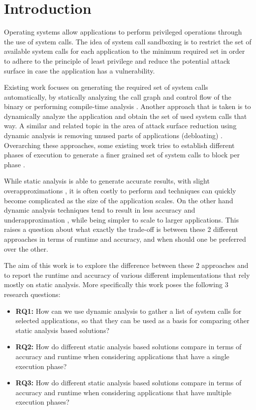 \section{Introduction}
Operating systems allow applications to perform privileged operations through the use of system calls. The idea of system call sandboxing is to restrict the set of available system calls for each application to the minimum required set in order to adhere to the principle of least privilege \cite{ref_plp_1} and reduce the potential attack surface in case the application has a vulnerability.

Existing work focuses on generating the required set of system calls automatically, by statically analyzing the call graph and control flow of the binary \cite{ref_sp_3,ref_sp_2} or performing compile-time analysis \cite{ref_sp_1}.
Another approach that is taken is to dynamically analyze the application \cite{ref_dyn_1} and obtain the set of used system calls that way. A similar and related topic in the area of attack surface reduction using dynamic analysis is removing unused parts of applications (debloating) \cite{ref_debloat_1,ref_debloat_2}. %
Overarching these approaches, some existing work tries to establish different phases of execution to generate a finer grained set of system calls to block per phase \cite{ref_mp_1}.

While static analysis is able to generate accurate results, with slight overapproximations \cite{ref_dyn_1}, it is often costly to perform \cite{ref_sp_1} and techniques can quickly become complicated as the size of the application scales.
On the other hand dynamic analysis techniques tend to result in less accuracy and underapproximation \cite{ref_sp_3}, while being simpler to scale to larger applications.
This raises a question about what exactly the trade-off is between these 2 different approaches in terms of runtime and accuracy, and when should one be preferred over the other.

The aim of this work is to explore the difference between these 2 approaches and to report the runtime and accuracy of various different implementations that rely mostly on static analysis.
More specifically this work poses the following 3 research questions:
\begin{itemize}
    \item{\textbf{RQ1:} How can we use dynamic analysis to gather a list of system calls for selected applications, so that they can be used as a basis for comparing other static analysis based solutions?}
    \item{\textbf{RQ2:} How do different static analysis based solutions compare in terms of accuracy and runtime when considering applications that have a single execution phase?}
    \item{\textbf{RQ3:} How do different static analysis based solutions compare in terms of accuracy and runtime when considering applications that have multiple execution phases?}
\end{itemize}

